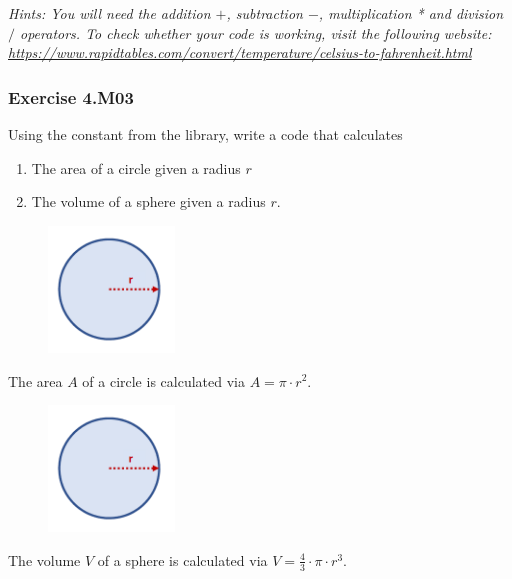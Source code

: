\textit{Hints:
You will need the addition $+$, subtraction $-$, multiplication * and division $/$ operators. To
check whether your code is working, visit the following website:
\url{https://www.rapidtables.com/convert/temperature/celsius-to-fahrenheit.html}}\\[1cm]



\subsubsection*{Exercise 4.M03 \red{[M]}}
Using the {} constant from the {} library, write a code that calculates
\begin{enumerate}[label=(\alph*)]
	\item The area of a circle given a radius $r$
	\item The volume of a sphere given a radius $r$.
\end{enumerate}

\begin{figure}[H]
		\centering
		\includegraphics[width=0.3\textwidth]{../IMG/4M03_1.png} 
\end{figure}

The area $A$ of a circle is calculated via $A = \pi \cdot r^2$.


\begin{figure}[H]
		\centering
		\includegraphics[width=0.3\textwidth]{../IMG/4M03_1.png} 
\end{figure}

The volume $V$ of a sphere is calculated via $V = \frac{4}{3} \cdot \pi \cdot r^3$.\\

